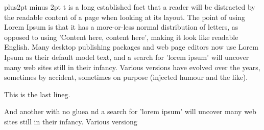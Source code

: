 \hsize=3.5in \vsize=2in
\parskip 1pt plus2pt minus 2pt
t is a long established fact that a reader will be distracted by the readable content of a page when looking at its layout. The point of using Lorem Ipsum is that it has a more-or-less normal distribution of letters, as opposed to using 'Content here, content here', making it look like readable English. Many desktop publishing packages and web page editors now use Lorem Ipsum as their default model text, and a search for 'lorem ipsum' will uncover many web sites still in their infancy. Various versions have evolved over the years, sometimes by accident, sometimes on purpose (injected humour and the like).

This is the last lineg.
\vfill

And another with no gluea nd a search for 'lorem ipsum' will uncover many web sites still in their infancy. Various versiong
\bye